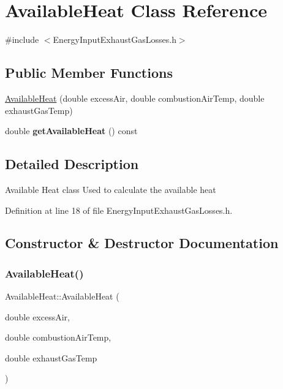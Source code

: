 \hypertarget{class_available_heat}{}\section{Available\+Heat Class Reference}
\label{class_available_heat}


{\ttfamily \#include $<$Energy\+Input\+Exhaust\+Gas\+Losses.\+h$>$}

\subsection*{Public Member Functions}
\begin{DoxyCompactItemize}
\item 
\hyperlink{class_available_heat_a98f7aeccc8f074fbd46db8f9b67f7d7b}{Available\+Heat} (double excess\+Air, double combustion\+Air\+Temp, double exhaust\+Gas\+Temp)
\item 
\mbox{\label{class_available_heat_a90fcf9a6eca9bd7839b81935fcf16942}} 
double {\bfseries get\+Available\+Heat} () const
\end{DoxyCompactItemize}


\subsection{Detailed Description}
Available Heat class Used to calculate the available heat 

Definition at line 18 of file Energy\+Input\+Exhaust\+Gas\+Losses.\+h.



\subsection{Constructor \& Destructor Documentation}
\mbox{\label{class_available_heat_a98f7aeccc8f074fbd46db8f9b67f7d7b}} 
\subsubsection{\texorpdfstring{Available\+Heat()}{AvailableHeat()}}
{\footnotesize\ttfamily Available\+Heat\+::\+Available\+Heat (\begin{DoxyParamCaption}\item[{double}]{excess\+Air,  }\item[{double}]{combustion\+Air\+Temp,  }\item[{double}]{exhaust\+Gas\+Temp }\end{DoxyParamCaption})}

